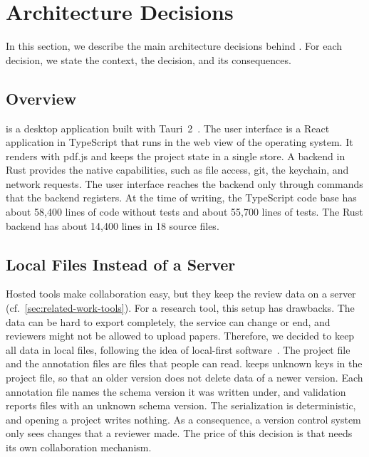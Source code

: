 \section{Architecture Decisions}\label{sec:architecture}

In this section, we describe the main architecture decisions behind \SaiLoR.
For each decision, we state the context, the decision, and its consequences.

\subsection{Overview}\label{sec:architecture-overview}

\SaiLoR is a desktop application built with Tauri~2~\cite{tauri2}.
The user interface is a React application in TypeScript that runs in the web view of the operating system.
It renders \PDFs with pdf.js and keeps the project state in a single store.
A backend in Rust provides the native capabilities, such as file access, git, the keychain, and network requests.
The user interface reaches the backend only through commands that the backend registers.
At the time of writing, the TypeScript code base has about 58,400 lines of code without tests and about 55,700 lines of tests.
The Rust backend has about 14,400 lines in 18 source files.

\subsection{Local Files Instead of a Server}\label{sec:architecture-local}

Hosted tools make collaboration easy, but they keep the review data on a server (cf.~\autoref{sec:related-work-tools}).
For a research tool, this setup has drawbacks.
The data can be hard to export completely, the service can change or end, and reviewers might not be allowed to upload papers.
Therefore, we decided to keep all data in local files, following the idea of local-first software~\cite{kleppmann2019local}.
The project file and the annotation files are \JSON files that people can read.
\SaiLoR keeps unknown keys in the project file, so that an older version does not delete data of a newer version.
Each annotation file names the schema version it was written under, and validation reports files with an unknown schema version.
The serialization is deterministic, and opening a project writes nothing.
As a consequence, a version control system only sees changes that a reviewer made.
The price of this decision is that \SaiLoR needs its own collaboration mechanism.

